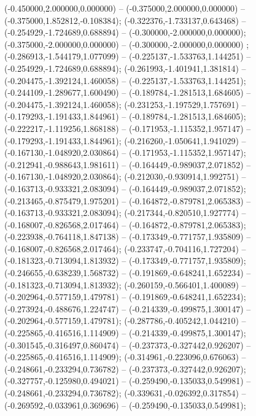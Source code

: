  (-0.450000,2.000000,0.000000) -- (-0.375000,2.000000,0.000000) -- (-0.375000,1.852812,-0.108384);
 (-0.322376,-1.733137,0.643468) -- (-0.254929,-1.724689,0.688894) -- (-0.300000,-2.000000,0.000000);
 (-0.375000,-2.000000,0.000000) -- (-0.300000,-2.000000,0.000000) ;
 (-0.286913,-1.544179,1.077099) -- (-0.225137,-1.533763,1.144251) -- (-0.254929,-1.724689,0.688894);
 (-0.261993,-1.401941,1.381814) -- (-0.204475,-1.392124,1.460058) -- (-0.225137,-1.533763,1.144251);
 (-0.244109,-1.289677,1.600490) -- (-0.189784,-1.281513,1.684605) -- (-0.204475,-1.392124,1.460058);
 (-0.231253,-1.197529,1.757691) -- (-0.179293,-1.191433,1.844961) -- (-0.189784,-1.281513,1.684605);
 (-0.222217,-1.119256,1.868188) -- (-0.171953,-1.115352,1.957147) -- (-0.179293,-1.191433,1.844961);
 (-0.216260,-1.050641,1.941029) -- (-0.167130,-1.048920,2.030864) -- (-0.171953,-1.115352,1.957147);
 (-0.212941,-0.988643,1.981611) -- (-0.164449,-0.989037,2.071852) -- (-0.167130,-1.048920,2.030864);
 (-0.212030,-0.930914,1.992751) -- (-0.163713,-0.933321,2.083094) -- (-0.164449,-0.989037,2.071852);
 (-0.213465,-0.875479,1.975201) -- (-0.164872,-0.879781,2.065383) -- (-0.163713,-0.933321,2.083094);
 (-0.217344,-0.820510,1.927774) -- (-0.168007,-0.826568,2.017464) -- (-0.164872,-0.879781,2.065383);
 (-0.223938,-0.764118,1.847138) -- (-0.173349,-0.771757,1.935809) -- (-0.168007,-0.826568,2.017464);
 (-0.233747,-0.704116,1.727204) -- (-0.181323,-0.713094,1.813932) -- (-0.173349,-0.771757,1.935809);
 (-0.246655,-0.638239,1.568732) -- (-0.191869,-0.648241,1.652234) -- (-0.181323,-0.713094,1.813932);
 (-0.260159,-0.566401,1.400089) -- (-0.202964,-0.577159,1.479781) -- (-0.191869,-0.648241,1.652234);
 (-0.273924,-0.488676,1.224747) -- (-0.214339,-0.499875,1.300147) -- (-0.202964,-0.577159,1.479781);
 (-0.287786,-0.405242,1.044210) -- (-0.225865,-0.416516,1.114909) -- (-0.214339,-0.499875,1.300147);
 (-0.301545,-0.316497,0.860474) -- (-0.237373,-0.327442,0.926207) -- (-0.225865,-0.416516,1.114909);
 (-0.314961,-0.223096,0.676063) -- (-0.248661,-0.233294,0.736782) -- (-0.237373,-0.327442,0.926207);
 (-0.327757,-0.125980,0.494021) -- (-0.259490,-0.135033,0.549981) -- (-0.248661,-0.233294,0.736782);
 (-0.339631,-0.026392,0.317854) -- (-0.269592,-0.033961,0.369696) -- (-0.259490,-0.135033,0.549981);
